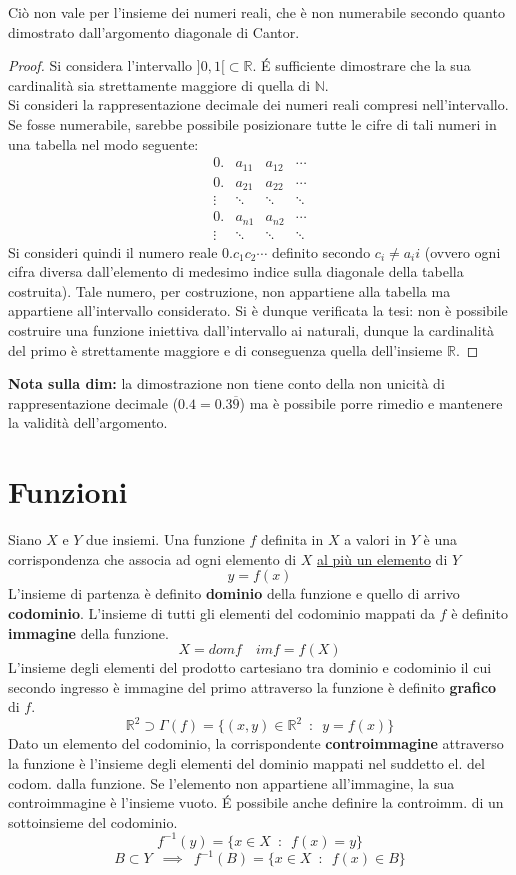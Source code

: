 \documentclass[10pt]{article}
\theoremstyle{plain}
\begin{document}
Ciò non vale per l'insieme dei numeri reali, che è non numerabile secondo quanto dimostrato dall'argomento diagonale di Cantor.
\begin{proof}
    Si considera l'intervallo $]0,1[ \subset \mathbb{R}$. \'E sufficiente dimostrare che la sua cardinalità sia strettamente maggiore di quella di $\mathbb{N}$.
    \\Si consideri la rappresentazione decimale dei numeri reali compresi nell'intervallo. Se fosse numerabile, sarebbe possibile posizionare tutte le cifre di tali numeri in una tabella nel modo seguente:
    \[\begin{matrix}
    0. & a_{11} & a_{12} & \cdots \\
    0. & a_{21} & a_{22} & \cdots \\
    \vdots & \ddots & \ddots & \ddots \\
    0. & a_{n1} & a_{n2} & \cdots \\
    \vdots & \ddots & \ddots & \ddots
    \end{matrix}\]
    Si consideri quindi il numero reale $0.c_1 c_2 \cdots$ definito secondo $c_i \neq a_ii$ (ovvero ogni cifra diversa dall'elemento di medesimo indice sulla diagonale della tabella costruita). Tale numero, per costruzione, non appartiene alla tabella ma appartiene all'intervallo considerato. Si è dunque verificata la tesi: non è possibile costruire una funzione iniettiva dall'intervallo ai naturali, dunque la cardinalità del primo è strettamente maggiore e di conseguenza quella dell'insieme $\mathbb{R}$.
\end{proof}
\textbf{Nota sulla dim: } la dimostrazione non tiene conto della non unicità di rappresentazione decimale ($0.4 = 0.3\overline{9}$) ma è possibile porre rimedio e mantenere la validità dell'argomento.


\section{Funzioni}
\begin{defin}
Siano $X$ e $Y$ due insiemi. Una funzione $f$ definita in $X$ a valori in $Y$ è una corrispondenza che associa ad ogni elemento di $X$ \underline{al più un elemento} di $Y$
\[y = f(x)\]
L'insieme di partenza è definito \textbf{dominio} della funzione e quello di arrivo \textbf{codominio}. L'insieme di tutti gli elementi del codominio mappati da $f$ è definito \textbf{immagine} della funzione.
\[X = dom f \quad im f = f(X)\]
L'insieme degli elementi del prodotto cartesiano tra dominio e codominio il cui secondo ingresso è immagine del primo attraverso la funzione è definito \textbf{grafico} di $f$.
\[\mathbb{R}^2 \supset \Gamma (f) = \{(x,y) \in \mathbb{R}^2 \enspace : \enspace y = f(x) \}\]
Dato un elemento del codominio, la corrispondente \textbf{controimmagine} attraverso la funzione è l'insieme degli elementi del dominio mappati nel suddetto el. del codom. dalla funzione. Se l'elemento non appartiene all'immagine, la sua controimmagine è l'insieme vuoto. \'E possibile anche definire la controimm. di un sottoinsieme del codominio.
\[f^{-1}(y) = \{x \in X \enspace : \enspace f(x) = y\}\] \[B \subset Y \enspace \implies \enspace f^{-1}(B) = \{x \in X \enspace : \enspace f(x) \in B\}\]
\end{defin}
\end{document}
